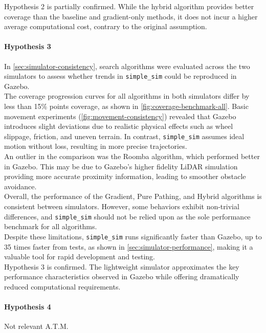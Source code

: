 Hypothesis 2 is partially confirmed. While the hybrid algorithm provides better coverage than the baseline and gradient-only methods, it does not incur a higher average computational cost, contrary to the original assumption.

\paragraph{Hypothesis 3}
In \cref{sec:simulator-consistency}, search algorithms were evaluated across the two simulators to assess whether trends in \texttt{simple\_sim} could be reproduced in Gazebo. \\

The coverage progression curves for all algorithms in both simulators differ by less than 15\% points coverage, as shown in \cref{fig:coverage-benchmark-all}. Basic movement experiments (\cref{fig:movement-consistency}) revealed that Gazebo introduces slight deviations due to realistic physical effects such as wheel slippage, friction, and uneven terrain. In contrast, \texttt{simple\_sim} assumes ideal motion without loss, resulting in more precise trajectories. \\

An outlier in the comparison was the Roomba algorithm, which performed better in Gazebo. This may be due to Gazebo’s higher fidelity LiDAR simulation providing more accurate proximity information, leading to smoother obstacle avoidance.\\

Overall, the performance of the Gradient, Pure Pathing, and Hybrid algorithms is consistent between simulators. However, some behaviors exhibit non-trivial differences, and \texttt{simple\_sim} should not be relied upon as the sole performance benchmark for all algorithms. \\

Despite these limitations, \texttt{simple\_sim} runs significantly faster than Gazebo, up to 35 times faster from tests, as shown in \cref{sec:simulator-performance}, making it a valuable tool for rapid development and testing. \\

Hypothesis 3 is confirmed. The lightweight simulator approximates the key performance characteristics observed in Gazebo while offering dramatically reduced computational requirements.

\paragraph{Hypothesis 4}
Not relevant A.T.M.
